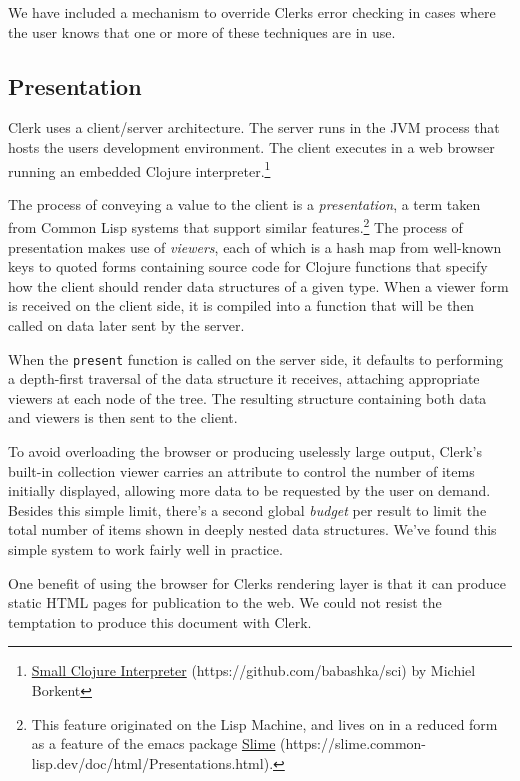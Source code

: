 \documentclass[sigconf,screen,pbalance=true]{acmart}
\newcommand{\passthrough}[1]{#1}
\begin{document}
We have included a mechanism to override Clerk\textquotesingle s error checking in cases where the user knows that one or more of these techniques are in use.

\hypertarget{presentation}{%
\subsection{Presentation}\label{presentation}}

Clerk uses a client/server architecture. The server runs in the JVM process that hosts the user\textquotesingle s development environment. The client executes in a web browser running an embedded Clojure interpreter.\footnote{{\href{https://github.com/babashka/sci}{Small Clojure Interpreter} (https://github.com/babashka/sci)} by Michiel Borkent}

The process of conveying a value to the client is a \emph{presentation}, a
term taken from Common Lisp systems that support similar features.\footnote{This feature originated on the Lisp Machine, and lives on in a reduced form as a feature of the emacs package {\href{https://slime.common-lisp.dev/doc/html/Presentations.html}{Slime} (https://slime.common-lisp.dev/doc/html/Presentations.html)}.} The process of presentation makes use of \emph{viewers}, each of which is a hash map from well-known keys to quoted forms containing source code for Clojure functions that specify how the client should render data structures of a given type. When a viewer form is received on the client side, it is compiled into a function that will be then called on data later sent by the server.

When the \passthrough{\lstinline!present!} function is called on the server side, it defaults to performing a depth-first traversal of the data structure it receives, attaching appropriate viewers at each node of the tree. The resulting structure containing both data and viewers is then sent to the client.

To avoid overloading the browser or producing uselessly large output, Clerk's built-in collection viewer carries an attribute to control the number of items initially displayed, allowing more data to be requested by the user on demand. Besides this simple limit, there's a second global \emph{budget} per result to limit the total number of items shown in deeply nested data structures. We've found this simple system to work fairly well in practice.

One benefit of using the browser for Clerk\textquotesingle s rendering layer is that it can produce static HTML pages for publication to the web. We could not resist the temptation to produce this document with Clerk.
\end{document}
